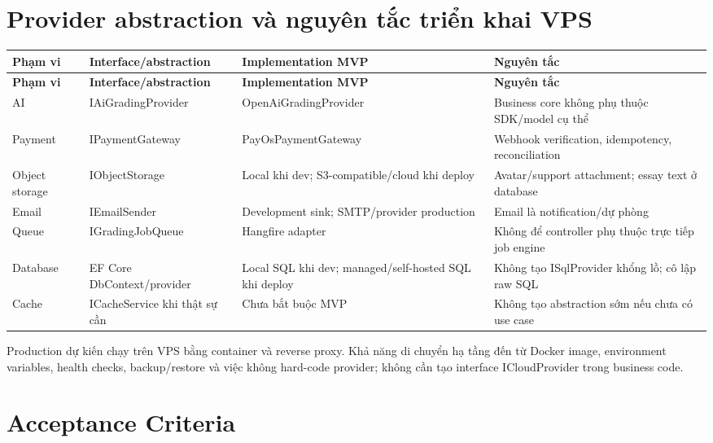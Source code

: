 \documentclass[11pt,a4paper]{article}
\begin{document}
\section{Provider abstraction và nguyên tắc triển khai VPS}
\small
\setlength{\tabcolsep}{4pt}
\renewcommand{\arraystretch}{1.18}
\begin{longtable}{|P{0.18\textwidth}|P{0.22\textwidth}|P{0.25\textwidth}|P{0.27\textwidth}|}
\hline
\textbf{Phạm vi} & \textbf{Interface/\allowbreak{}abstraction} & \textbf{Implementation MVP} & \textbf{Nguyên tắc} \\ \hline
\endfirsthead
\hline
\textbf{Phạm vi} & \textbf{Interface/\allowbreak{}abstraction} & \textbf{Implementation MVP} & \textbf{Nguyên tắc} \\ \hline
\endhead
AI & IAiGradingProvider & OpenAiGradingProvider & Business core không phụ thuộc SDK/\allowbreak{}model cụ thể \\ \hline
Payment & IPaymentGateway & PayOsPaymentGateway & Webhook verification, idempotency, reconciliation \\ \hline
Object storage & IObjectStorage & Local khi dev; S3-compatible/\allowbreak{}cloud khi deploy & Avatar/\allowbreak{}support attachment; essay text ở database \\ \hline
Email & IEmailSender & Development sink; SMTP/\allowbreak{}provider production & Email là notification/\allowbreak{}dự phòng \\ \hline
Queue & IGradingJobQueue & Hangfire adapter & Không để controller phụ thuộc trực tiếp job engine \\ \hline
Database & EF Core DbContext/\allowbreak{}provider & Local SQL khi dev; managed/\allowbreak{}self-hosted SQL khi deploy & Không tạo ISqlProvider khổng lồ; cô lập raw SQL \\ \hline
Cache & ICacheService khi thật sự cần & Chưa bắt buộc MVP & Không tạo abstraction sớm nếu chưa có use case \\ \hline
\end{longtable}
\normalsize
Production dự kiến chạy trên VPS bằng container và reverse proxy. Khả năng di chuyển hạ tầng đến từ Docker image, environment variables, health checks, backup/\allowbreak{}restore và việc không hard-code provider; không cần tạo interface ICloudProvider trong business code.

\section{Acceptance Criteria}
\end{document}
